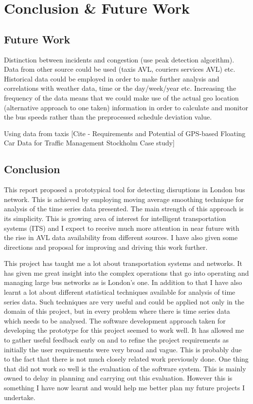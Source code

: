 \chapter{Conclusion \& Future Work}

\section{Future Work}
Distinction between incidents and congestion (use peak detection algorithm).
Data from other source could be used (taxis AVL, couriers services AVL) etc.
Historical data could be employed in order to make further analysis and correlations with weather data, time or the day/week/year etc.
Increasing the frequency of the data means that we could make use of the actual geo location (alternative approach to one taken) information in order to calculate and monitor the bus speeds rather than the preprocessed schedule deviation value.

Using data from taxis [Cite - Requirements and Potential of GPS-based Floating Car Data for Traffic Management Stockholm Case study]

\section{Conclusion}
This report proposed a prototypical tool for detecting disruptions in London bus network. This is achieved by employing moving average smoothing technique for analysis of the time series data presented. The main strength of this approach is its simplicity. This is growing area of interest for intelligent transportation systems (ITS) and I expect to receive much more attention in near future with the rise in AVL data availability from different sources. I have also given some directions and proposal for improving and driving this work further.

This project has taught me a lot about transportation systems and networks. It has given me great insight into the complex operations that go into operating and managing large bus networks as is London's one. In addition to that I have also learnt a lot about different statistical techniques available for analysis of time series data. Such techniques are very useful and could be applied not only in the domain of this project, but in every problem where there is time series data which needs to be analysed. The software development approach taken for developing the prototype for this project seemed to work well. It has allowed me to gather useful feedback early on and to refine the project requirements as initially the user requirements were very broad and vague. This is probably due to the fact that there is not much closely related work previously done. One thing that did not work so well is the evaluation of the software system. This is mainly owned to delay in planning and carrying out this evaluation. However this is something I have now learnt and would help me better plan my future projects I undertake.


